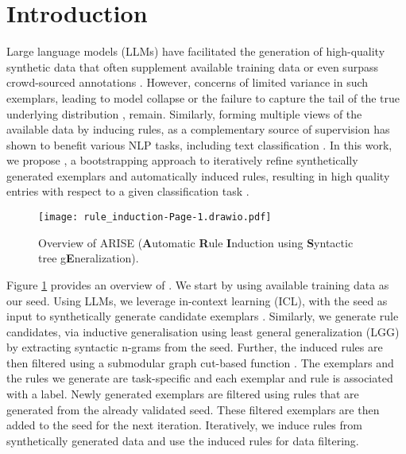 
\section{Introduction}

Large language models (LLMs) have facilitated the generation of high-quality synthetic data that often supplement available training data \cite{lin-etal-2023-selective} or even surpass crowd-sourced annotations \cite{augmentationPNAS,alizadeh2023open}. However, concerns of limited variance in such exemplars, leading to model collapse \cite{shumailov2023curse} or the failure to capture the tail of the true underlying distribution \cite{ding2024data}, remain. Similarly, forming multiple views of the available data by inducing rules, as a complementary source of supervision has shown to benefit various NLP tasks, including text classification \cite{maheshwari2021semi,dong-etal-2022-syntactic}.  In this work, we propose \our, a bootstrapping approach to iteratively refine synthetically generated exemplars and automatically induced rules, resulting in high quality entries with respect to a given classification task \cite{yarowsky-1995-unsupervised,varma2018snuba}. 

\begin{figure}[h] 
   \centering
   \texttt{[image: rule\_induction-Page-1.drawio.pdf]}
   \caption{Overview of ARISE (\textbf{A}utomatic \textbf{R}ule \textbf{I}nduction using \textbf{S}yntactic tree g\textbf{E}neralization).} 
   \label{archi}
\end{figure}

Figure \ref{archi} provides an overview of \our. We start by using available training data as our seed. Using LLMs, we leverage in-context learning (ICL), with the seed as input to synthetically generate candidate exemplars \cite{liu-etal-2022-makes}. Similarly, we generate rule candidates, via inductive generalisation using least general generalization (LGG)~\cite{plotkin1971further,Raza_Gulwani_Milic-Frayling_2014} by extracting syntactic n-grams from the seed. Further, the induced rules are then filtered using a submodular graph cut-based function \cite{bajpai-etal-2024-fair, kothawade2021prism}. The exemplars and the rules we generate are task-specific and each exemplar and rule is associated with a label. Newly generated exemplars are filtered using rules that are generated from the already validated seed. These filtered exemplars are then added to the seed for the next iteration. Iteratively, we induce rules from synthetically generated data and use the induced rules for data filtering. 



